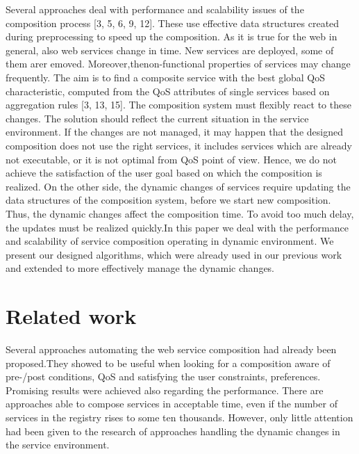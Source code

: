 \documentclass[10pt]{llncs}
\begin{document}
Several approaches deal with performance and scalability issues of the composition process [3, 5, 6, 9, 12]. These use effective data structures created during preprocessing to speed up the composition. As it is true for the web in general, also web services change in time. New services are deployed, some of them arer emoved. Moreover,thenon-functional properties of services may change frequently. The aim is to ﬁnd a composite service with the best global QoS characteristic, computed from the QoS attributes of single services based on aggregation rules [3, 13, 15]. The composition system must ﬂexibly react to these changes. The solution should reﬂect the current situation in the service environment. If the changes are not managed, it may happen that the designed composition does not use the right services, it includes services which are already not executable, or it is not optimal from QoS point of view. Hence, we do not achieve the satisfaction of the user goal based on which the composition is realized. On the other side, the dynamic changes of services require updating the data structures of the composition system, before we start new composition. Thus, the dynamic changes affect the composition time. To avoid too much delay, the updates must be realized quickly.In this paper we deal with the performance and scalability of service composition operating in dynamic environment. We present our designed algorithms, which were already used in our previous work and extended to more effectively manage the dynamic changes.


\section{Related work}
Several approaches automating the web service composition had already been proposed.They showed to be useful when looking for a composition aware of pre-/post conditions, QoS and satisfying the user constraints, preferences. Promising results were achieved also regarding the performance. There are approaches able to compose services in acceptable time, even if the number of services in the registry rises to some ten thousands. However, only little attention had been given to the research of approaches handling the dynamic changes in the service environment.
\end{document}
